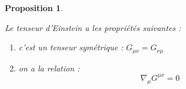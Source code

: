 \documentclass[a4paper,11pt]{report}
\theoremstyle{definition}
\theoremstyle{plain}
\newtheorem{prop}[thm]{Proposition}
\theoremstyle{definition}
\theoremstyle{remark}
\begin{document}
        \begin{prop}\begin{leftbar}
            Le tenseur d'Einstein a les propriétés suivantes :
            \begin{enumerate}[label = \textit{\roman*)}]
                \item c'est un tenseur symétrique : $G_{\mu\nu} = G_{\nu\mu}$
                \item on a la relation :
                \begin{equation}
                    \nabla_\mu G^{\mu\nu} = 0
                \end{equation}
            \end{enumerate}
        \end{leftbar}\end{prop}
        
\end{document}
